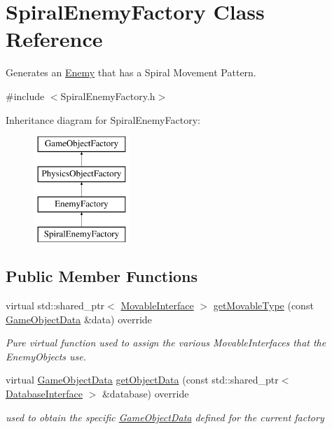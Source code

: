 \hypertarget{class_spiral_enemy_factory}{}\section{Spiral\+Enemy\+Factory Class Reference}
\label{class_spiral_enemy_factory}


Generates an \hyperlink{class_enemy}{Enemy} that has a Spiral Movement Pattern.  




{\ttfamily \#include $<$Spiral\+Enemy\+Factory.\+h$>$}

Inheritance diagram for Spiral\+Enemy\+Factory\+:\begin{figure}[H]
\begin{center}
\leavevmode
\includegraphics[height=4.000000cm]{dd/ddd/class_spiral_enemy_factory}
\end{center}
\end{figure}
\subsection*{Public Member Functions}
\begin{DoxyCompactItemize}
\item 
virtual std\+::shared\+\_\+ptr$<$ \hyperlink{class_movable_interface}{Movable\+Interface} $>$ \hyperlink{class_spiral_enemy_factory_aa05ff998b19ec4ef7ddd86ff24f70cba}{get\+Movable\+Type} (const \hyperlink{struct_game_object_data}{Game\+Object\+Data} \&data) override
\begin{DoxyCompactList}\small\item\em Pure virtual function used to assign the various Movable\+Interfaces that the Enemy\+Objects use. \end{DoxyCompactList}\item 
virtual \hyperlink{struct_game_object_data}{Game\+Object\+Data} \hyperlink{class_spiral_enemy_factory_a230709a0781c4364aa062b0bd441ec4d}{get\+Object\+Data} (const std\+::shared\+\_\+ptr$<$ \hyperlink{class_database_interface}{Database\+Interface} $>$ \&database) override
\begin{DoxyCompactList}\small\item\em used to obtain the specific \hyperlink{struct_game_object_data}{Game\+Object\+Data} defined for the current factory \end{DoxyCompactList}\end{DoxyCompactItemize}


